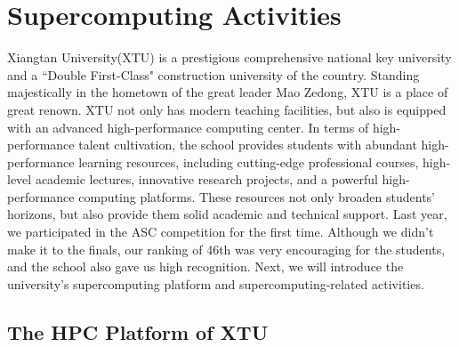 \section{Supercomputing Activities}
Xiangtan University(XTU) is a prestigious comprehensive national key university and a ``Double First-Class" construction university of the country. 
Standing majestically in the hometown of the great leader Mao Zedong, XTU is a place of great renown. 
XTU not only has modern teaching facilities, but also is equipped with an advanced high-performance computing center. 
In terms of high-performance talent cultivation, the school provides students with abundant high-performance learning resources, including cutting-edge professional courses, high-level academic lectures, innovative research projects, and a powerful high-performance computing platforms. 
These resources not only broaden students' horizons, but also provide them solid academic and technical support. 
Last year, we participated in the ASC competition for the first time. 
Although we didn't make it to the finals, our ranking of 46th was very encouraging for the students, and the school also gave us high recognition.
Next, we will introduce the university's supercomputing platform and supercomputing-related activities.

\subsection{The HPC Platform of XTU}
\ 


